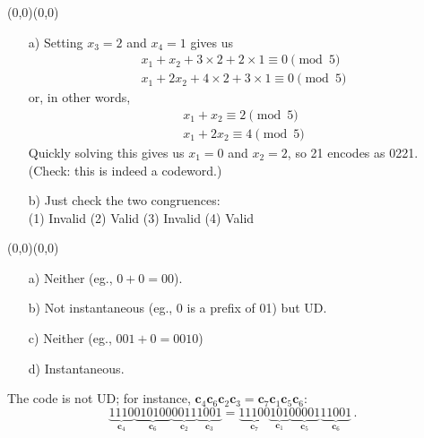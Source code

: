 \documentclass[11pt]{article}
\renewcommand{\vec}[1]{\mathbf{#1}}
\newcommand{\upabit}{\begin{picture}(0,0)(0,0)\end{picture}\vspace*{-5mm}}
\begin{document}
\bigskip
{}\upabit
\begin{itemize}
  \item[{a)}] Setting $x_3 = 2$ and $x_4 = 1$ gives us
    \begin{align*}
      x_1 +  x_2 + 3\times 2 + 2\times 1 \equiv 0\pmod{5}\\
      x_1 + 2x_2 + 4\times 2 + 3\times 1 \equiv 0\pmod{5}
    \end{align*}
    or, in other words,
    \begin{align*}
      x_1 +  x_2 \equiv 2\pmod{5}\\
      x_1 + 2x_2 \equiv 4\pmod{5}
    \end{align*}
    Quickly solving this gives us $x_1 = 0$ and $x_2 = 2$,
    so 21 encodes as 0221.
    \\(Check: this is indeed a codeword.)
  \item[{b)}] Just check the two congruences:\\
              (1) Invalid \: (2) Valid \: (3) Invalid \: (4) Valid
\end{itemize}

\newpage
{}\upabit
\begin{itemize}
  \item[{a)}] Neither (eg., $0 + 0 = 00$).
  \item[{b)}] Not instantaneous (eg., 0 is a prefix of 01) but UD.
  \item[{c)}] Neither (eg., $001 + 0 = 0010$)
  \item[{d)}] Instantaneous.
\end{itemize}

\bigskip
{}\quad
The code is not UD; for instance, 
 $\vec{c}_4\vec{c}_6\vec{c}_2\vec{c}_3
= \vec{c}_7\vec{c}_1\vec{c}_5\vec{c}_6$:
\[
    \underbrace{1110}_{\vec{c}_4}\underbrace{010100}_{\vec{c}_6}\underbrace{0011}_{\vec{c}_2}\underbrace{1001}_{\vec{c}_3}
  = \underbrace{11100}_{\vec{c}_7}\underbrace{101}_{\vec{c}_1}\underbrace{00001}_{\vec{c}_5}\underbrace{11001}_{\vec{c}_6}\,.
\]
\end{document}
